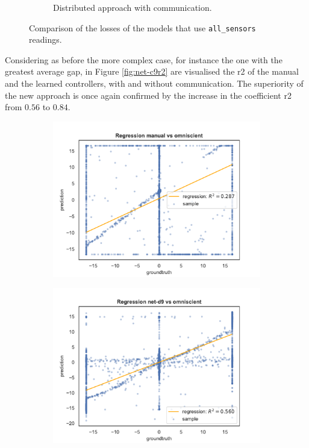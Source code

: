 \begin{figure}[!htb]
\begin{center}
\begin{subfigure}[h]{0.49\textwidth}
			\caption{Distributed approach with communication.}
		\end{subfigure}	
	\end{center}
	\vspace{-0.5cm}
	\caption{Comparison of the losses of the models that use \texttt{all\_sensors} 
		readings.}
	\label{fig:commlossall_sensors}
\end{figure}

Considering as before the more complex case, for instance the one with the 
greatest average gap, in Figure \ref{fig:net-c9r2} are visualised the \gls{r2} of the 
manual and the learned controllers, with and without communication.
The superiority of the new approach is once again confirmed by the increase in 
the coefficient \gls{r2} from $0.56$ to $0.84$. 
\begin{figure}[!htb]
	\begin{center}
		\begin{subfigure}[h]{0.49\textwidth}
			\includegraphics[width=\textwidth]{contents/images/net-d9/regression-manualvsomniscient}%
		\end{subfigure}
		\hfill\vspace{-0.5cm}
		\begin{subfigure}[h]{0.49\textwidth}
			\includegraphics[width=\textwidth]{contents/images/net-d9/regression-net-d9-vs-omniscient}%

\end{subfigure}
\end{center}
\end{figure}
